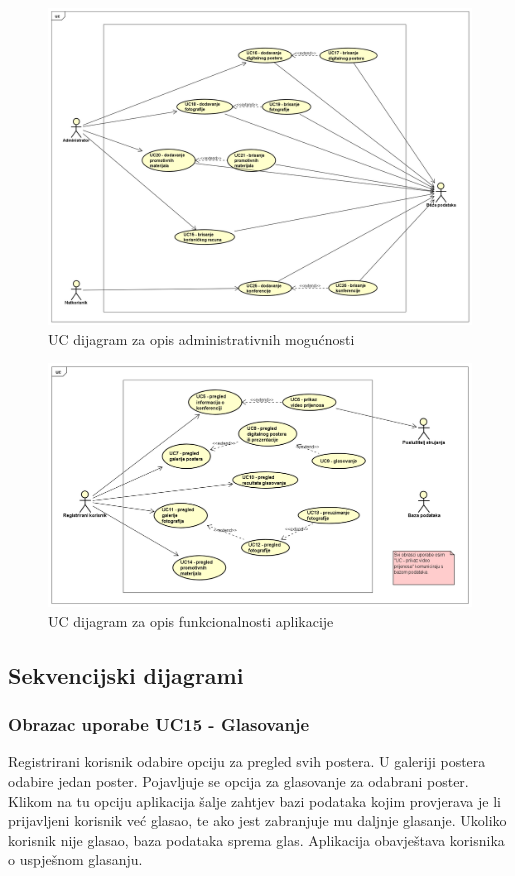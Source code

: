 					\begin{figure}
						\includegraphics[width=\linewidth]{Slike/UCDiagramAdminRevised.png}
						\caption{UC dijagram za opis administrativnih mogućnosti}
					\end{figure}
				
					\begin{figure}
						\includegraphics[width=\linewidth]{Slike/UCDiagramAppFunctionalitiesRevised.png}
						\caption{UC dijagram za opis funkcionalnosti aplikacije}
					\end{figure}
				
				\eject		
			
			\clearpage
			\subsection{Sekvencijski dijagrami}
				
				\subsubsection{Obrazac uporabe UC15 - Glasovanje}
				Registrirani korisnik odabire opciju za pregled svih postera. U galeriji postera odabire jedan poster. Pojavljuje se opcija za glasovanje za odabrani poster. Klikom na tu opciju aplikacija šalje zahtjev bazi podataka kojim provjerava je li prijavljeni korisnik već glasao, te ako jest zabranjuje mu daljnje glasanje. Ukoliko korisnik nije glasao, baza podataka sprema glas. Aplikacija obavještava korisnika o uspješnom glasanju.
				
